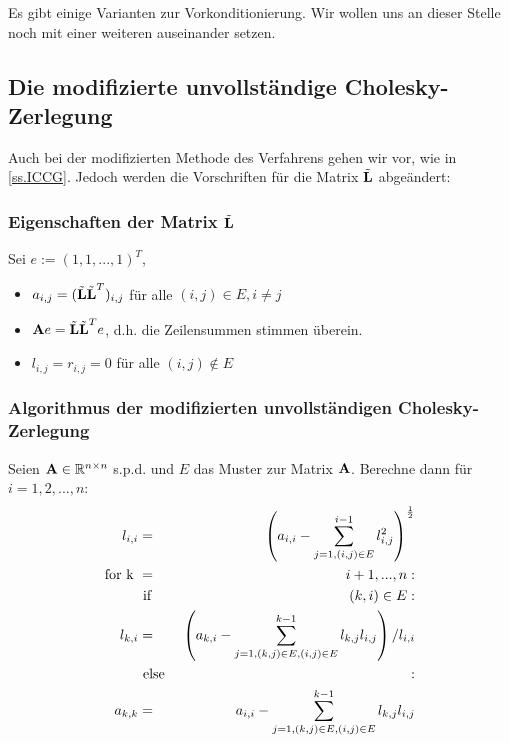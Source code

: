 Es gibt einige Varianten zur Vorkonditionierung. Wir wollen uns an dieser Stelle noch mit einer weiteren auseinander setzen.

\subsection{Die modifizierte unvollständige Cholesky-Zerlegung}\label{ss.Modifizierte Cholesky}

Auch bei der modifizierten Methode des Verfahrens gehen wir vor, wie in \autoref{ss.ICCG}. Jedoch werden die Vorschriften für die Matrix $\tilde{{\textbf{L}}}$ abgeändert:

\subsubsection{Eigenschaften der Matrix $\tilde{{\textbf{L}}}$}\label{sss.Eigenschaften L MCZ}

Sei $e := (1,1,...,1)^{T}$,

\begin{itemize}
\item $a_{i,j} = (\tilde{{\textbf{L}}} \tilde{{\textbf{L}}}^{T})_{i,j}$ für alle $(i,j) \in E, i \ne j$
\item ${\textbf{A}} e = \tilde{{\textbf{L}}} \tilde{{\textbf{L}}}^{T} e$, d.h. die Zeilensummen stimmen überein.
\item $l_{i,j} = r_{i,j} = 0$ für alle $(i,j) \notin E$
\end{itemize}

\subsubsection{Algorithmus der modifizierten unvollständigen Cholesky-Zerlegung}\label{sss.Algorithmus MUCZ}

Seien ${\textbf{A}} \in \mathbb{R}^{n \times n}$ s.p.d. und $E$ das Muster zur Matrix ${\textbf{A}}$. Berechne dann für $i=1,2,...,n$:
\begin{eqnarray}
l_{i,i} &=& \left( a_{i,i} - \sum^{i-1}_{j=1,(i,j) \in E} l_{i,j}^{2} \right)^{\frac {1} {2}} \\
\textnormal{for k } &=& i+1,...,n: \\
&\textnormal{ if }& (k,i) \in E: \\
l_{k,i} &=& \left( a_{k,i} - \sum^{k-1}_{j=1,(k,j) \in E, (i,j) \in E} l_{k,j} l_{i,j} \right) / l_{i,i} \\
&\textnormal{ else }&:\\
a_{k,k} &=& a_{i,i} - \sum^{k-1}_{j=1,(k,j) \in E, (i,j) \in E} l_{k,j} l_{i,j}
\end{eqnarray}

